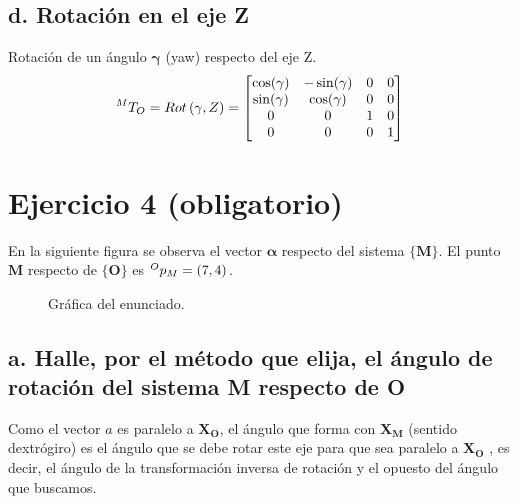 \documentclass[a4paper,12pt]{article}
\begin{document}
\subsection{d. Rotación en el eje Z}

Rotación de un ángulo $\mathbf{\gamma}$ (yaw) respecto del eje Z.
\begin{equation*}
    \prescript{M}{}{T_O} = Rot\left(\gamma, Z\right) = 
    \begin{bmatrix}
        \cos(\gamma) & -\sin(\gamma) & 0 & 0 \\
        \sin(\gamma) & \cos(\gamma)  & 0 & 0 \\
        0            & 0             & 1 & 0 \\
        0            & 0             & 0 & 1
    \end{bmatrix}
\end{equation*}

\section{Ejercicio 4 (obligatorio)}
En la siguiente figura se observa el vector $\mathbf{\alpha}$ respecto del sistema $\mathbf{\{M\}}$.
El punto $\mathbf{M}$ respecto de $\mathbf{\{O\}}$ es $\prescript{O}{}{p_M} = \left(7,4\right) $.

\begin{figure}[H]
    \centering
    \begin{adjustbox}{scale = 0.85, max width=\columnwidth}
    \end{adjustbox}
    \caption{Gráfica del enunciado.}
\end{figure}

\subsection{a. Halle, por el método que elija, el ángulo de rotación del sistema {M} respecto de {O}}
Como el vector $a$ es paralelo a $\mathbf{X_O}$, 
el ángulo que forma con $\mathbf{X_M}$ (sentido dextrógiro)
es el ángulo que se debe rotar este eje para que sea paralelo a $\mathbf{X_O}$
, es decir, el ángulo de la transformación inversa de rotación y el opuesto del 
ángulo que buscamos.
\end{document}
